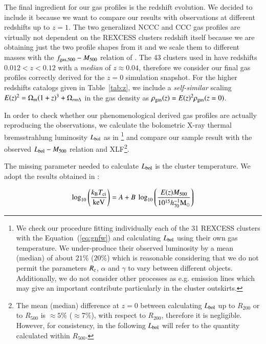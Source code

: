 \documentclass[traditabstract]{aa}
\begin{document}
The final ingredient for our gas profiles is the redshift evolution. We decided to include it because we want to compare our results with observations at different redshifts up to $z=1$. The two generalized NCCC and CCC gas profiles are virtually not dependent on the REXCESS clusters redshift itself because we are obtaining just the two profile shapes from it and we scale them to different masses with the $f_{\rm{gas},500}-M_{500}$ relation of \cite{2009ApJ...693.1142S}. The 43 clusters used in \cite{2009ApJ...693.1142S} have redshifts $0.012 < z < 0.12$ with a \emph{median} of $z \approx 0.04$, therefore we consider our final gas profiles correctly derived for the $z = 0$ simulation snapshot. For the higher redshifts catalogs given in Table~\ref{tab:z}, we include a \emph{self-similar} scaling $E(z)^{2} = \Omega_{\rm{m}} (1+z)^{3} + \Omega_{rm{\Delta}}$ in the gas density as $\rho_{\rm{gas}}(z) = E(z)^{2} \rho_{\rm{gas}}(z=0)$.

In order to check whether our phenomenological derived gas profiles are actually reproducing the observations, we calculate the bolometric X-ray thermal bremsstrahlung luminosity $L_{\rm{bol}}$ as in \cite{1988xrec.book.....S}\footnote[5]{We check our procedure fitting individually each of the 31 REXCESS clusters with the Equation~(\ref{eq:gnfw}) and calculating $L_{\rm{bol}}$ using their own gas temperature. We under-produce their observed luminosity by a mean (median) of about $21\%$ ($20\%$) which is reasonable considering that we do not permit the parameters $R_{\rm{c}}$, $\alpha$ and $\gamma$ to vary between different objects. Additionally, we do not consider other processes as e.g. emission lines which may give an important contribute particularly in the cluster outskirts.} and compare our sample result with the observed $L_{\rm{bol}} - M_{500}$ relation and XLF\footnote[6]{The mean (median) difference at $z=0$ between calculating $L_{\rm{bol}}$ up to $R_{200}$ or to $R_{500}$ is $\approx 5\%$ ($\approx 7\%$), with respect to $R_{200}$, therefore it is negligible. However, for consistency, in the following $L_{\rm{bol}}$ will refer to the quantity calculated within $R_{500}$.}. 

The missing parameter needed to calculate $L_{\rm{bol}}$ is the cluster temperature. We adopt the results obtained in \cite{2010MNRAS.406.1773M}:

\begin{equation}
\log_{10} \left( \frac{k_{\rm{B}}T_{\rm{ci}}}{\rm{keV}} \right) = A + B~\log_{10} \left( \frac{E(z) M_{500}}{10^{15} h_{70}^{-1} \rm{M_{\odot}}} \right)
\label{eq:temp}
\end{equation}
 
\end{document}
